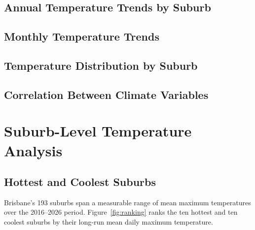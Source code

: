 \documentclass{article}
\begin{document}
\subsection{Annual Temperature Trends by Suburb}

\subsection{Monthly Temperature Trends}

\subsection{Temperature Distribution by Suburb}

\subsection{Correlation Between Climate Variables}

\section{Suburb-Level Temperature Analysis}
\label{sec:suburb}

\subsection{Hottest and Coolest Suburbs}

Brisbane's 193 suburbs span a measurable range of mean maximum temperatures over the
2016--2026 period. Figure~\ref{fig:ranking} ranks the ten hottest and ten coolest suburbs
by their long-run mean daily maximum temperature.
\end{document}
